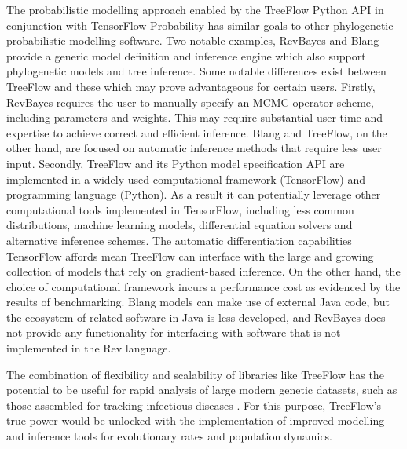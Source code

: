 The probabilistic modelling approach enabled by the TreeFlow Python API in conjunction with TensorFlow Probability has similar goals to other phylogenetic probabilistic modelling software. Two notable examples, RevBayes \cite{hohna2016revbayes} and Blang \cite{bouchard2022blang} provide a generic model definition and inference engine which also support phylogenetic models and tree inference. Some notable differences exist between TreeFlow and these which may prove advantageous for certain users. Firstly, RevBayes requires the user to manually specify an MCMC operator scheme, including parameters and weights. This may require substantial user time and expertise to achieve correct and efficient inference. Blang and TreeFlow, on the other hand, are focused on automatic inference methods that require less user input. Secondly, TreeFlow and its Python model specification API are implemented in a widely used computational framework (TensorFlow) and programming language (Python). As a result it can potentially leverage other computational tools implemented in TensorFlow, including less common distributions, machine learning models, differential equation solvers and alternative inference schemes. The automatic differentiation capabilities TensorFlow affords mean TreeFlow can interface with the large and growing collection of models that rely on gradient-based inference. On the other hand, the choice of computational framework incurs a performance cost as evidenced by the results of benchmarking. Blang models can make use of external Java code, but the ecosystem of related software in Java is less developed, and RevBayes does not provide any functionality for interfacing with software that is not implemented in the Rev language.

The combination of flexibility and scalability of libraries like TreeFlow has the potential to be useful for rapid analysis of large modern genetic datasets, such as those assembled for tracking infectious diseases \cite{hadfield2018nextstrain}. For this purpose, TreeFlow's true power would be unlocked with the implementation of improved modelling and inference tools for evolutionary rates and population dynamics.

